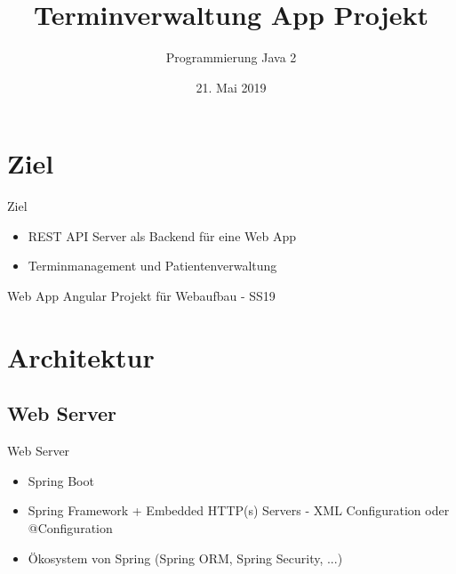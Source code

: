 \documentclass{beamer}
\title{Terminverwaltung App Projekt}
\author{Programmierung Java 2}
\date{21. Mai 2019}
\begin{document}
\begin{frame}
  \titlepage
\end{frame}

\section{Ziel}

\begin{frame}{Ziel}
  
  \begin{itemize}
    \item REST API Server als Backend für eine Web App
    \item Terminmanagement und Patientenverwaltung 
  \end{itemize}
  
  \vskip 1cm
  
  \begin{block}{Web App}
    Angular Projekt für Webaufbau - SS19
  \end{block}
  
\end{frame}

\section{Architektur}

\subsection{Web Server}

\begin{frame}{Web Server}
  
  \begin{itemize}
    \item Spring Boot
    \item Spring Framework + Embedded HTTP(s) Servers - XML Configuration oder @Configuration
    \item Ökosystem von Spring (Spring ORM, Spring Security, ...)
  \end{itemize}
  
\end{frame}
\end{document}
